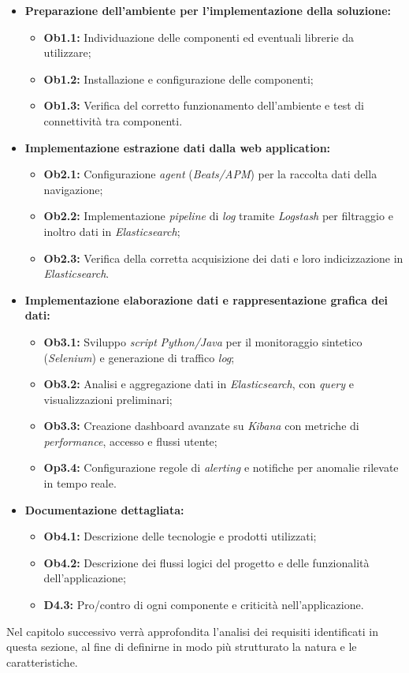 \begin{itemize}
    \item \textbf{Preparazione dell'ambiente per l'implementazione della soluzione:}  
        \begin{itemize}
            \item \textbf{Ob1.1:} Individuazione delle componenti ed eventuali librerie da utilizzare;
            \item \textbf{Ob1.2:} Installazione e configurazione delle componenti;
            \item \textbf{Ob1.3:} Verifica del corretto funzionamento dell'ambiente e test di connettività tra componenti.
        \end{itemize}
    \item \textbf{Implementazione estrazione dati dalla web application:}  
        \begin{itemize}
            \item \textbf{Ob2.1:} Configurazione \emph{agent} (\emph{Beats/APM}) per la raccolta dati della navigazione;
            \item \textbf{Ob2.2:} Implementazione \emph{pipeline} di \emph{log} tramite \emph{Logstash} per filtraggio e inoltro dati in \emph{Elasticsearch};
            \item \textbf{Ob2.3:} Verifica della corretta acquisizione dei dati e loro indicizzazione in \emph{Elasticsearch}.
        \end{itemize}
    \item \textbf{Implementazione elaborazione dati e rappresentazione grafica dei dati:}  
        \begin{itemize}
            \item \textbf{Ob3.1:} Sviluppo \emph{script} \emph{Python/Java} per il monitoraggio sintetico (\emph{Selenium}) e generazione di traffico \emph{log};
            \item \textbf{Ob3.2:} Analisi e aggregazione dati in \emph{Elasticsearch}, con \emph{query} e visualizzazioni preliminari;
            \item \textbf{Ob3.3:} Creazione dashboard avanzate su \emph{Kibana} con metriche di \emph{performance}, accesso e flussi utente;
            \item \textbf{Op3.4:} Configurazione regole di \emph{alerting} e notifiche per anomalie rilevate in tempo reale.
        \end{itemize}
    \item \textbf{Documentazione dettagliata:}  
        \begin{itemize}
            \item \textbf{Ob4.1:} Descrizione delle tecnologie e prodotti utilizzati;
            \item \textbf{Ob4.2:} Descrizione dei flussi logici del progetto e delle funzionalità dell'applicazione;
            \item \textbf{D4.3:} Pro/contro di ogni componente e criticità nell'applicazione.
        \end{itemize}
\end{itemize} 
Nel capitolo successivo verrà approfondita l'analisi dei requisiti identificati in questa sezione, al fine di definirne in modo più strutturato la natura e le caratteristiche.